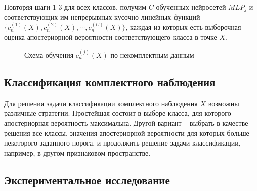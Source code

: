 Повторяя шаги 1-3 для всех классов, получим \(C\) обученных нейросетей \(MLP_j\) и соответствующих им непрерывных кусочно-линейных функций \(\{c_n^{(1)}(X), c_n^{(2)}(X), \cdots, c_n^{(C)}(X)\}\), каждая из которых есть выборочная оценка апостериорной вероятности соответствующего класса в точке \(X\).

\begin{figure}[ht]
    \caption{Схема обучения \(c_n^{(j)}(X)\) по некомплектным данным}
    \label{fig:missing_diagram}
\end{figure}


\subsection{Классификация комплектного наблюдения}

Для решения задачи классификации комплектного наблюдения \(X\) возможны различные стратегии. Простейшая состоит в выборе класса, для которого апостериорная вероятность максимальна. Другой вариант -- выбрать в качестве решения все классы, значения апостериорной вероятности для которых больше некоторого заданного порога, и продолжить решение задачи классификации, например, в другом признаковом пространстве.

\subsection{Экспериментальное исследование}

